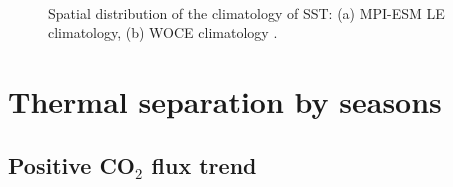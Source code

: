 \begin{figure}[bth]
        \myfloatalign
         \\
       \caption{Spatial distribution of the climatology of \acf{SST}: (a) \acs{MPI-ESM LE} climatology, (b) WOCE climatology \citep{WOCE}.} \label{fig:SOCS_comp_SST}
\end{figure}

\clearpage
\section{Thermal separation by seasons}
\subsection{Positive CO$_2$ flux trend}

